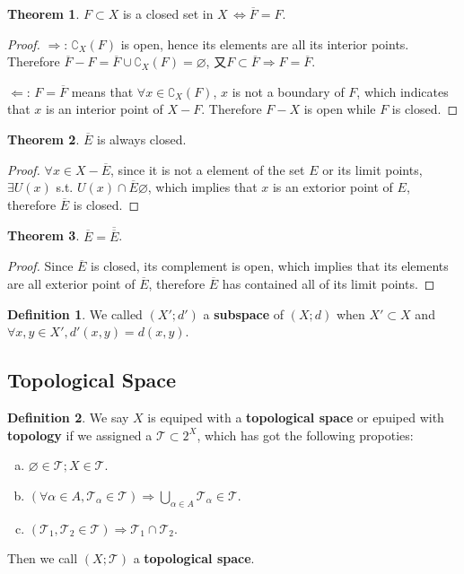 \documentclass{article}
\theoremstyle{plain}
\theoremstyle{definition}
\newtheorem{dfn}{Definition}[section] %
\newtheorem{thrm}{Theorem}[section] %
\begin{document}
\begin{thrm}\label{closed_closure}
$F\subset X$ is a closed set in $X\,\Leftrightarrow \overline{F}=F$.
\end{thrm}
\begin{proof}
$\Rightarrow$: $\complement_X(F)$ is open, hence its elements are all its interior points. Therefore $\overline{F}-F=\overline{F}\cup\complement_X(F)=\varnothing$, 又$F\subset\overline{F}\Rightarrow F=\overline{F}$.

$\Leftarrow$: $F=\overline{F}$ means that $\forall x\in \complement_X(F)$, $x$ is not a boundary of $F$, which indicates that $x$ is an interior point of $X-F$. Therefore $F-X$ is open while $F$ is closed.
\end{proof}
\begin{thrm}\label{closure_closed}
$\overline{E} $ is always closed.
\end{thrm}
\begin{proof}
$\forall x \in X - \overline{E}$, since it is not a element of  the set $E$ or its limit points, $\exists U( x) $ s.t. $U( x) \cap \overline{E} \varnothing$, which implies that $x$ is an extorior point of $E$, therefore $\overline{E}$ is closed.
\end{proof}
\begin{thrm}\label{closure_closure}
$\overline{E}=\overline{ \overline{E}}$.
\end{thrm}
\begin{proof}
Since $\overline{E}$ is closed, its complement is open, which implies that its elements are all exterior point of $\overline{E}$, therefore $\overline{E}$ has contained all of its limit points.
\end{proof}
\begin{dfn}\label{subspace_metric}
We called $(X';d')$ a \textbf{subspace} of $(X;d)$ when $X'\subset X$ and $\forall x,y\in X',d'(x,y)=d(x,y)$.
\end{dfn}
\subsection{Topological Space}
\begin{dfn}\label{topological_space}
We say $X$ is equiped with a \textbf{topological space} or epuiped with \textbf{topology} if we assigned a $\mathscr{T}\subset 2^X$, which has got the following propoties:
\begin{enumerate}[a)]
	\item $\varnothing\in\mathscr{T};X\in\mathscr{T}$.
	\item $\left(\forall\alpha\in A,\mathscr{T}_\alpha\in\mathscr{T}\right)
	\Rightarrow\bigcup\limits_{\alpha\in A}\mathscr{T}_\alpha\in\mathscr{T}$.
	\item $\left(\mathscr{T}_1,\mathscr{T}_2\in\mathscr{T}\right)\Rightarrow \mathscr{T}_1\cap\mathscr{T}_2$.
\end{enumerate}
Then we call $(X;\mathscr{T})$ a \textbf{topological space}.
\end{dfn}
\end{document}
